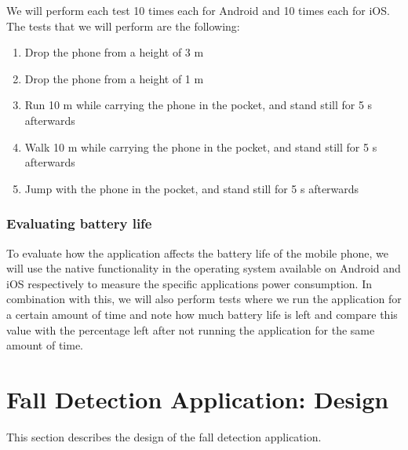 \documentclass[12pt, a4paper, onecolumn]{article}
\begin{document}
	We will perform each test 10 times each for Android and 10 times each for iOS. The tests that we will perform are the following:
	
	\begin{enumerate}
		\item Drop the phone from a height of 3 m 
		\item Drop the phone from a height of 1 m
		\item Run 10 m while carrying the phone in the pocket, and stand still for 5 s afterwards
		\item Walk 10 m while carrying the phone in the pocket, and stand still for 5 s afterwards
		\item Jump with the phone in the pocket, and stand still for 5 s afterwards
	\end{enumerate}
	
	\subsubsection{Evaluating battery life}
	
	To evaluate how the application affects the battery life of the mobile phone, we will use the native functionality in the operating system available on Android and iOS respectively to measure the specific applications power consumption.
	In combination with this, we will also perform tests where we run the application for a certain amount of time and note how much battery life is left and compare this value with the percentage left after not running the application for the same amount of time.
	
	\newpage
	\section{Fall Detection Application: Design}
	
	This section describes the design of the fall detection application.
	
\end{document}
